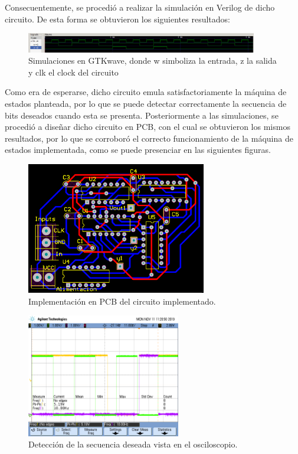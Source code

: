 Consecuentemente, se procedió a realizar la simulación en Verilog de dicho circuito. De esta forma se obtuvieron los siguientes resultados:
\begin{figure}[H]
\centering
\includegraphics[width=0.9\textwidth]{ImagenesEjercicio2/simulacion.png}
\caption{Simulaciones en GTKwave, donde w simboliza la entrada, z la salida y clk el clock del circuito}
\end{figure}

Como era de esperarse, dicho circuito emula satisfactoriamente la máquina de estados planteada, por lo que se puede detectar correctamente la secuencia de bits deseados cuando esta se presenta. Posteriormente a las simulaciones, se procedió a diseñar dicho circuito en PCB, con el cual se obtuvieron los mismos resultados, por lo que se corroboró el correcto funcionamiento de la máquina de estados implementada, como se puede presenciar en las siguientes figuras.
\begin{figure}[H]
\centering
\includegraphics[width=0.7\textwidth]{ImagenesEjercicio2/pcb.png}
\caption{Implementación en PCB del circuito implementado.}
\end{figure}

\begin{figure}[H]
\centering
\includegraphics[width=0.6\textwidth,trim={0 2.2cm 0.1cm 1.75cm},clip]{ImagenesEjercicio2/scope_0.png}
\caption{Detección de la secuencia deseada vista en el osciloscopio.}
\label{fig:med-ej2}
\end{figure}

